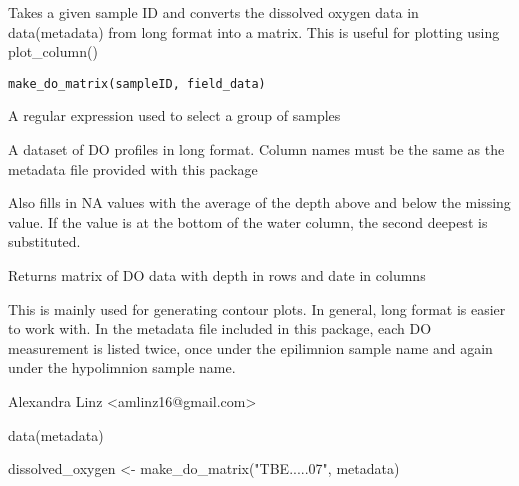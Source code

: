 \documentclass[a4paper]{book}
\begin{document}
%
\begin{Description}\relax
Takes a given sample ID and converts the dissolved oxygen data in data(metadata) from long format into a matrix. This is useful for plotting using plot\_column()
\end{Description}
%
\begin{Usage}
\begin{verbatim}
make_do_matrix(sampleID, field_data)
\end{verbatim}
\end{Usage}
%
\begin{Arguments}
\begin{ldescription}
\item[\code{sampleID}] 
A regular expression used to select a group of samples

\item[\code{field\_data}] 
A dataset of DO profiles in long format. Column names must be the same as the metadata file provided with this package

\end{ldescription}
\end{Arguments}
%
\begin{Details}\relax
Also fills in NA values with the average of the depth above and below the missing value. If the value is at the bottom of the water column, the second deepest is substituted.
\end{Details}
%
\begin{Value}
Returns matrix of DO data with depth in rows and date in columns
\end{Value}
%
\begin{Note}\relax
This is mainly used for generating contour plots. In general, long format is easier to work with.
In the metadata file included in this package, each DO measurement is listed twice, once under the epilimnion sample name and again under the hypolimnion sample name.
\end{Note}
%
\begin{Author}\relax
Alexandra Linz <amlinz16@gmail.com>
\end{Author}
%
\begin{Examples}
\begin{ExampleCode}
data(metadata)

dissolved_oxygen <- make_do_matrix("TBE.....07", metadata)
\end{ExampleCode}
\end{Examples}
\end{document}
